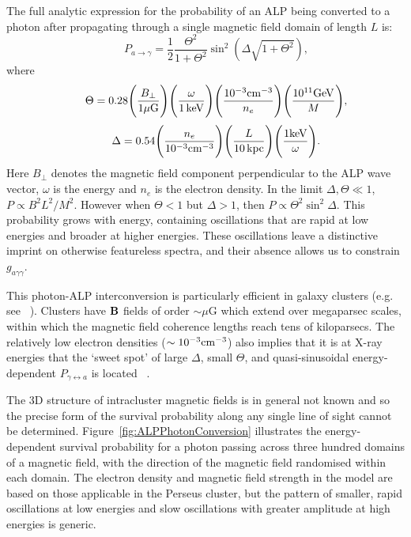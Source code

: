 \documentclass[fleqn,usenatbib,useAMS]{mnras}
\begin{document}
The full analytic expression for the probability of an ALP being converted to a photon after propagating through a single magnetic field domain of length $L$ is:
\begin{equation}
\qquad P_{a \rightarrow \gamma} = \frac{1}{2}\frac{\Theta^2}{1 + \Theta^2}\sin^2 \left( \Delta \sqrt{1 + \Theta^2} \right),
\end{equation}
where
\begin{equation}
\qquad \Theta = 0.28 \Bigg(\frac{B_{\perp}}{1 \mu\rm{G}}\Bigg)\Bigg(\frac{\omega}{1 \, \rm{keV}}\Bigg)\Bigg(\frac{10^{-3} \rm{cm}^{-3}}{n_e}\Bigg)\Bigg(\frac{10^{11} \rm{GeV}}{M}\Bigg),
\end{equation}
\begin{equation}
\qquad \Delta = 0.54 \Bigg(\frac{n_e}{10^{-3} \rm{cm}^{-3}}\Bigg)\Bigg(\frac{L}{10 \, \rm{kpc}}\Bigg)\Bigg(\frac{1 \rm{keV}}{\omega}\Bigg).
\end{equation}
Here $B_{\perp}$ denotes the magnetic field component perpendicular to the ALP wave vector, $\omega$ is the energy and $n_e$ is the electron density. In the limit $\Delta, \Theta \ll 1$, $P \propto B^2 L^2 / M^2$. However when $\Theta < 1$ but $\Delta > 1$, then
$ P \propto \Theta^2 \sin^2 \Delta$.
This probability grows with energy, containing oscillations that are rapid at low energies and broader at higher energies. These
oscillations leave a distinctive imprint on otherwise featureless spectra, and their absence allows us to constrain $g_{a\gamma\gamma}$.

This photon-ALP interconversion is particularly efficient in galaxy clusters (e.g. see ~\citep{0902.2320,1305.3603}).
Clusters have ${\bf B}$ fields of order $\sim \mu$G which extend over megaparsec scales, within which the magnetic field coherence lengths reach tens of kiloparsecs.
The relatively low electron densities ($\sim 10^{-3}\rm{cm}^{-3}$) also implies that it is at X-ray energies that the `sweet spot' of large
 $\Delta$, small $\Theta$, and  quasi-sinusoidal energy-dependent $P_{\gamma \leftrightarrow a}$ is located ~\citep{1304.0989, 1305.3603, 1312.3947, 1509.06748}.

The 3D structure of intracluster magnetic fields is in general not known and so
the precise form of the survival probability along any single line of sight cannot be determined. Figure~\ref{fig:ALPPhotonConversion} illustrates the energy-dependent survival probability for a photon passing across three hundred domains of a magnetic field, with the direction of the magnetic
field randomised within each domain. The electron density and magnetic field strength in
the model are based on those applicable in the Perseus cluster, but the pattern of smaller, rapid oscillations at low energies and slow oscillations with greater amplitude at high energies is generic.
\end{document}
